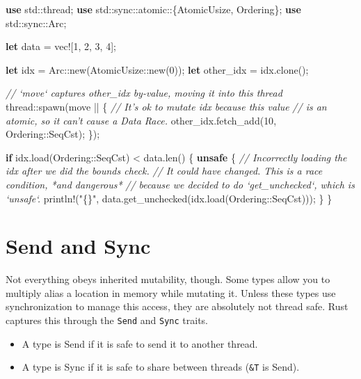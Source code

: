 \documentclass[a4paper,]{book}
\newenvironment{Shaded}{\begin{snugshade}}{\end{snugshade}}
\newcommand{\KeywordTok}[1]{\textcolor[rgb]{0.13,0.29,0.53}{\textbf{{#1}}}}
\newcommand{\DecValTok}[1]{\textcolor[rgb]{0.00,0.00,0.81}{{#1}}}
\newcommand{\StringTok}[1]{\textcolor[rgb]{0.31,0.60,0.02}{{#1}}}
\newcommand{\CommentTok}[1]{\textcolor[rgb]{0.56,0.35,0.01}{\textit{{#1}}}}
\newcommand{\OtherTok}[1]{\textcolor[rgb]{0.56,0.35,0.01}{{#1}}}
\newcommand{\NormalTok}[1]{{#1}}
\begin{document}
\begin{Shaded}
\begin{Highlighting}[]
\KeywordTok{use} \NormalTok{std::thread;}
\KeywordTok{use} \NormalTok{std::sync::atomic::\{AtomicUsize, Ordering\};}
\KeywordTok{use} \NormalTok{std::sync::Arc;}

\KeywordTok{let} \NormalTok{data = }\OtherTok{vec!}\NormalTok{[}\DecValTok{1}\NormalTok{, }\DecValTok{2}\NormalTok{, }\DecValTok{3}\NormalTok{, }\DecValTok{4}\NormalTok{];}

\KeywordTok{let} \NormalTok{idx = Arc::new(AtomicUsize::new(}\DecValTok{0}\NormalTok{));}
\KeywordTok{let} \NormalTok{other_idx = idx.clone();}

\CommentTok{// `move` captures other_idx by-value, moving it into this thread}
\NormalTok{thread::spawn(move || \{}
    \CommentTok{// It's ok to mutate idx because this value}
    \CommentTok{// is an atomic, so it can't cause a Data Race.}
    \NormalTok{other_idx.fetch_add(}\DecValTok{10}\NormalTok{, Ordering::SeqCst);}
\NormalTok{\});}

\KeywordTok{if} \NormalTok{idx.load(Ordering::SeqCst) < data.len() \{}
    \KeywordTok{unsafe} \NormalTok{\{}
        \CommentTok{// Incorrectly loading the idx after we did the bounds check.}
        \CommentTok{// It could have changed. This is a race condition, *and dangerous*}
        \CommentTok{// because we decided to do `get_unchecked`, which is `unsafe`.}
        \OtherTok{println!}\NormalTok{(}\StringTok{"\{\}"}\NormalTok{, data.get_unchecked(idx.load(Ordering::SeqCst)));}
    \NormalTok{\}}
\NormalTok{\}}
\end{Highlighting}
\end{Shaded}

\section{Send and Sync}\label{sec--send-and-sync}

Not everything obeys inherited mutability, though. Some types allow you
to multiply alias a location in memory while mutating it. Unless these
types use synchronization to manage this access, they are absolutely not
thread safe. Rust captures this through the \texttt{Send} and
\texttt{Sync} traits.

\begin{itemize}
\itemsep1pt\parskip0pt
\item
  A type is Send if it is safe to send it to another thread.
\item
  A type is Sync if it is safe to share between threads (\texttt{\&T} is
  Send).
\end{itemize}
\end{document}
